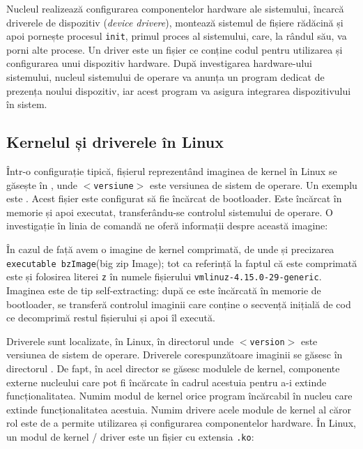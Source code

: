 Nucleul realizează configurarea componentelor hardware ale sistemului, încarcă
driverele de dispozitiv (\textit{device drivere}), montează sistemul de fișiere rădăcină
și apoi pornește procesul \texttt{init}, primul proces al sistemului, care, la rândul său,
va porni alte procese. Un driver este un fișier ce conține codul
pentru utilizarea și configurarea unui dispozitiv hardware. După investigarea
hardware-ului sistemului, nucleul sistemului de operare va anunța un program dedicat
de prezența noului dispozitiv, iar acest program va asigura integrarea dispozitivului în sistem.

\subsection{Kernelul și driverele în Linux}
\label{sec:boot:os-linux}

Într-o configurație tipică, fișierul reprezentând imaginea de kernel în Linux se
găsește în , unde \texttt{$<$versiune$>$} este versiunea de sistem de
operare. Un exemplu este . Acest fișier este
configurat să fie încărcat de bootloader. Este încărcat în memorie și apoi
executat, transferându-se controlul sistemului de operare. O investigație în
linia de comandă ne oferă informații despre această imagine:


În cazul de față avem o imagine de kernel comprimată,
de unde și precizarea \texttt{executable bzImage}(big zip Image); tot ca referință la faptul că este
comprimată este și folosirea literei \texttt{z} în numele fișierului
\texttt{vmlinuz-4.15.0-29-generic}. Imaginea este de tip self-extracting: după ce este
încărcată în memorie de bootloader, se transferă controlul imaginii care conține
o secvență inițială de cod ce decomprimă restul fișierului și apoi îl execută.

Driverele sunt localizate, în Linux, în directorul 
unde \texttt{$<$version$>$} este versiunea de sistem de operare. Driverele
corespunzătoare imaginii  se găsesc în directorul
. De fapt, în acel director se
găsesc modulele de kernel, componente externe nucleului care pot fi încărcate în
cadrul acestuia pentru a-i extinde funcționalitatea. Numim modul de kernel orice program
încărcabil în nucleu care extinde funcționalitatea acestuia. Numim drivere acele module de kernel al căror rol este de a permite
utilizarea și configurarea componentelor hardware.  În Linux, un modul de kernel / driver este un fișier cu extensia \texttt{.ko}:

